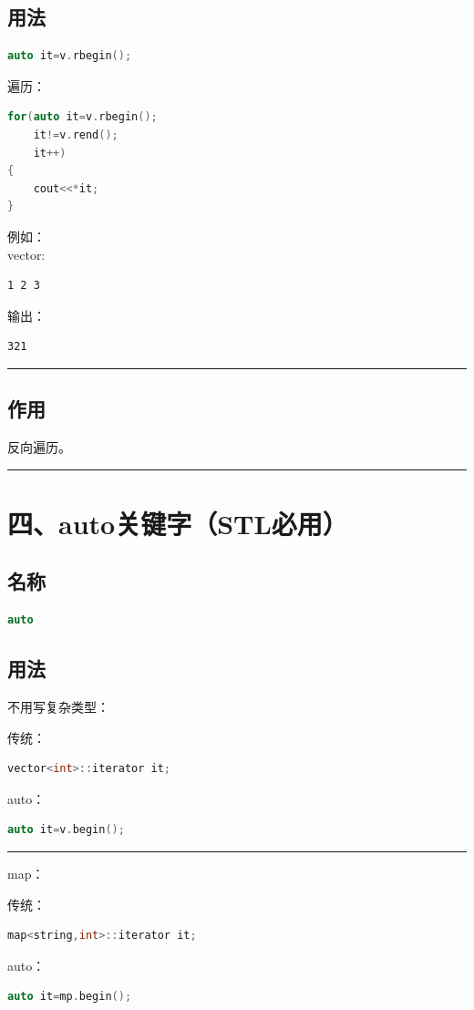\documentclass[10pt,twocolumn]{extarticle}
\begin{document}
\subsection{用法}
\begin{lstlisting}[language=C++]
auto it=v.rbegin();
\end{lstlisting}
遍历：
\begin{lstlisting}[language=C++]
for(auto it=v.rbegin();
    it!=v.rend();
    it++)
{
    cout<<*it;
}
\end{lstlisting}
例如：\\
vector:
\begin{lstlisting}
1 2 3
\end{lstlisting}
输出：
\begin{lstlisting}
321
\end{lstlisting}

\noindent\rule{\linewidth}{0.4pt}

\subsection{作用}
反向遍历。

\noindent\rule{\linewidth}{0.4pt}

\section{四、auto关键字（STL必用）}

\subsection{名称}
\begin{lstlisting}[language=C++]
auto
\end{lstlisting}

\subsection{用法}
不用写复杂类型：

传统：
\begin{lstlisting}[language=C++]
vector<int>::iterator it;
\end{lstlisting}
auto：
\begin{lstlisting}[language=C++]
auto it=v.begin();
\end{lstlisting}

\noindent\rule{\linewidth}{0.4pt}

map：

传统：
\begin{lstlisting}[language=C++]
map<string,int>::iterator it;
\end{lstlisting}
auto：
\begin{lstlisting}[language=C++]
auto it=mp.begin();
\end{lstlisting}
\end{document}
